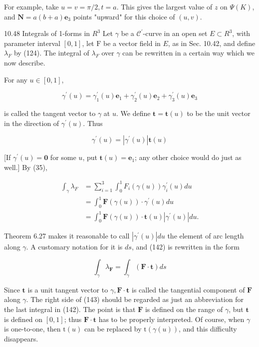 \documentclass[10pt]{article}
\begin{document}
For example, take $u=v=\pi / 2, t=a$. This gives the largest value of $z$ on $\Psi(K)$, and $\mathbf{N}=a(b+a) \mathbf{e}_{3}$ points "upward" for this choice of $(u, v)$.

10.48 Integrals of 1-forms in $R^{3}$ Let $\gamma$ be a $\mathscr{C}^{\prime}$-curve in an open set $E \subset R^{3}$, with parameter interval $[0,1]$, let $\mathrm{F}$ be a vector field in $E$, as in Sec. 10.42, and define $\lambda_{F}$ by (124). The integral of $\lambda_{F}$ over $\gamma$ can be rewritten in a certain way which we now describe.

For any $u \in[0,1]$,

$$
\gamma^{\prime}(u)=\gamma_{1}^{\prime}(u) \mathbf{e}_{1}+\gamma_{2}^{\prime}(u) \mathbf{e}_{2}+\gamma_{3}^{\prime}(u) \mathbf{e}_{3}
$$

is called the tangent vector to $\gamma$ at $u$. We define $\mathbf{t}=\mathbf{t}(u)$ to be the unit vector in the direction of $\gamma^{\prime}(u)$. Thus

$$
\gamma^{\prime}(u)=\left|\gamma^{\prime}(u)\right| \mathbf{t}(u)
$$

[If $\gamma^{\prime}(u)=\mathbf{0}$ for some $u$, put $\mathbf{t}(u)=\mathbf{e}_{1}$; any other choice would do just as well.] By (35),

$$
\begin{aligned}
\int_{\gamma} \lambda_{F} & =\sum_{i=1}^{3} \int_{0}^{1} F_{i}(\gamma(u)) \gamma_{i}^{\prime}(u) d u \\
& =\int_{0}^{1} \mathbf{F}(\gamma(u)) \cdot \gamma^{\prime}(u) d u \\
& =\int_{0}^{1} \mathbf{F}(\gamma(u)) \cdot \mathbf{t}(u)\left|\gamma^{\prime}(u)\right| d u .
\end{aligned}
$$

Theorem 6.27 makes it reasonable to call $\left|\gamma^{\prime}(u)\right| d u$ the element of arc length along $\gamma$. A customary notation for it is $d s$, and (142) is rewritten in the form

$$
\int_{\gamma} \lambda_{\mathbf{F}}=\int_{\gamma}(\mathbf{F} \cdot \mathbf{t}) d s
$$

Since $\mathbf{t}$ is a unit tangent vector to $\gamma, \mathbf{F} \cdot \mathbf{t}$ is called the tangential component of $\mathbf{F}$ along $\gamma$. The right side of (143) should be regarded as just an abbreviation for the last integral in (142). The point is that $\mathbf{F}$ is defined on the range of $\gamma$, but $\mathbf{t}$ is defined on $[0,1]$; thus $\mathbf{F} \cdot \mathbf{t}$ has to be properly interpreted. Of course, when $\gamma$ is one-to-one, then $\mathrm{t}(u)$ can be replaced by $\mathrm{t}(\gamma(u))$, and this difficulty disappears.
\end{document}
